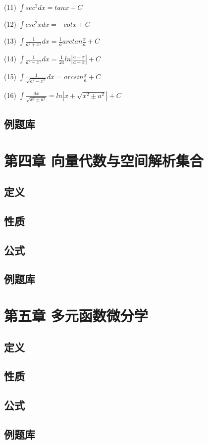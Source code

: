 \documentclass{ctexart}
\begin{document}
(11)  $\int sec^2dx=tanx+C$       

(12)  $\int csc^2xdx=-cotx+C$       

(13)  $\int \frac{1}{a^2+x^2}dx=\frac{1}{a}arctan\frac{x}{a}+C$

(14)  $\int \frac{1}{a^2-x^2}dx=\frac{1}{2a}ln|\frac{a+x}{a-x}|+C$

(15)  $\int \frac{1}{\sqrt{a^2-x^2}}dx=arcsin\frac{x}{a}+C$

(16)  $\int \frac{dx}{\sqrt{x^2 \pm a^2}}=ln|x+\sqrt{x^2 \pm a^2}|+C$

\subsection{例题库}


\section{第四章 向量代数与空间解析集合}
\subsection{定义}
\subsection{性质}
\subsection{公式}
\subsection{例题库}


\section{第五章 多元函数微分学}
\subsection{定义}
\subsection{性质}
\subsection{公式}
\subsection{例题库}
\newpage
\end{document}
